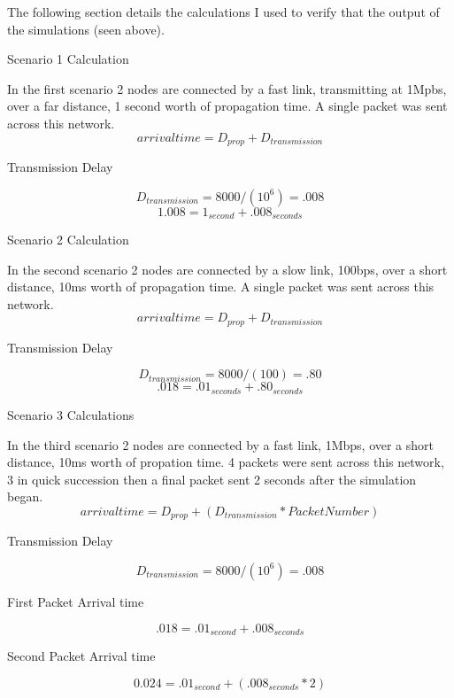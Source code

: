\documentclass[12pt]{article}
\begin{document}
The following section details the calculations I used to verify that the output of the simulations (seen above). 

\centerline{Scenario 1 Calculation}
In the first scenario 2 nodes are connected by a fast link, transmitting at 1Mpbs, over a far distance, 1 second worth of propagation time. A single packet was sent across this network.
\begin{equation}
arrival time = D_{prop} + D_{transmission}
\end{equation}
\centerline{Transmission Delay}
\begin{equation}
D_{transmission} = 8000 / (10^6) = .008
\end{equation}
\begin{equation}
1.008 = 1_{second} + .008_{seconds}
\end{equation}


\centerline{Scenario 2 Calculation}
In the second scenario 2 nodes are connected by a slow link, 100bps, over a short distance, 10ms worth of propagation time. A single packet was sent across this network.
\begin{equation}
arrival time = D_{prop} + D_{transmission}
\end{equation}
\centerline{Transmission Delay}
\begin{equation}
D_{transmission} = 8000 / (100) = .80
\end{equation}
\begin{equation}
.018 = .01_{seconds} + .80_{seconds}
\end{equation}

\centerline{Scenario 3 Calculations}
In the third scenario 2 nodes are connected by a fast link, 1Mbps, over a short distance, 10ms worth of propation time. 4 packets were sent across this network, 3 in quick succession then a final packet sent 2 seconds after the simulation began.
\begin{equation}
arrival time = D_{prop} + (D_{transmission} * Packet Number)
\end{equation}
\centerline{Transmission Delay}
\begin{equation}
D_{transmission} = 8000 / (10^6) = .008
\end{equation}

\centerline{First Packet Arrival time}
\begin{equation}
 .018 = .01_{second} + .008_{seconds}
\end{equation}

\centerline{Second Packet Arrival time}
\begin{equation}
  0.024 = .01_{second} + (.008_{seconds} * 2)
\end{equation}
\end{document}
